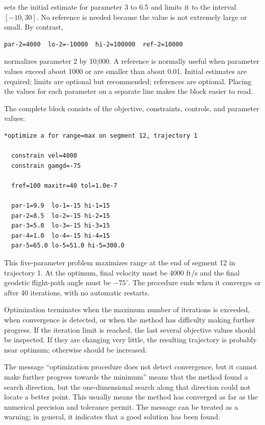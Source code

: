 sets the initial estimate for parameter 3 to 6.5 and limits it to the interval
$[-10,30]$.  No reference is needed because the value is not extremely large or
small.  By contrast,

\begin{lstlisting}[style=taosmanual]
par-2=4000  lo-2=-10000  hi-2=100000  ref-2=10000
\end{lstlisting}

normalizes parameter 2 by 10,000.  A reference is normally useful when parameter
values exceed about 1000 or are smaller than about 0.01.  Initial estimates are
required; limits are optional but recommended; references are optional.  Placing the
values for each parameter on a separate line makes the block easier to read.


The complete block consists of the objective, constraints, controls, and parameter
values:

\begin{lstlisting}[style=taosmanual]
*optimize a for range=max on segment 12, trajectory 1

  constrain vel=4000
  constrain gamgd=-75

  fref=100 maxitr=40 tol=1.0e-7

  par-1=9.9  lo-1=-15 hi-1=15
  par-2=8.5  lo-2=-15 hi-2=15
  par-3=5.0  lo-3=-15 hi-3=15
  par-4=1.0  lo-4=-15 hi-4=15
  par-5=65.0 lo-5=51.0 hi-5=300.0
\end{lstlisting}

This five-parameter problem maximizes range at the end of segment 12 in trajectory
1.  At the optimum, final velocity must be 4000 ft/s and the final geodetic
flight-path angle must be $-75^\circ$.  The procedure ends when it converges or after
40 iterations, with no automatic restarts.


Optimization terminates when the maximum number of iterations is exceeded, when
convergence is detected, or when the method has difficulty making further progress.
If the iteration limit is reached, the last several objective values should be inspected.
If they are changing very little, the resulting trajectory is probably near optimum;
otherwise  should be increased.

The message ``optimization procedure does not detect convergence, but it cannot
make further progress towards the minimum'' means that the method found a search
direction, but the one-dimensional search along that direction could not locate a
better point.  This usually means the method has converged as far as the numerical
precision and tolerance permit.  The message can be treated as a warning; in general,
it indicates that a good solution has been found.

